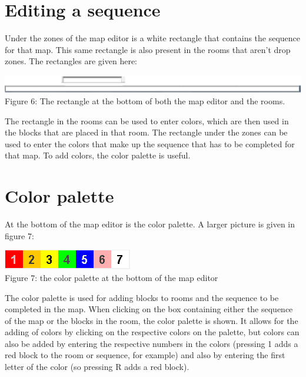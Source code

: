 \documentclass[]{article}
\begin{document}
\section*{Editing a sequence}
Under the zones of the map editor is a white rectangle that contains the sequence for that map. This same rectangle is also present in the rooms that aren't drop zones. The rectangles are given here:
\begin{center}
	\centering
	\includegraphics[scale=0.5]{SequenceEditor.png}\\
	Figure 6: The rectangle at the bottom of both the map editor and the rooms.
\end{center}
The rectangle in the rooms can be used to enter colors, which are then used in the blocks that are placed in that room. The rectangle under the zones can be used to enter the colors that make up the sequence that has to be completed for that map. To add colors, the color palette is useful.
\section*{Color palette}
At the bottom of the map editor is the color palette. A larger picture is given in figure 7:
\begin{center}
	\centering
	\includegraphics{ColorPalette.png}\\
	Figure 7: the color palette at the bottom of the map editor
\end{center}
The color palette is used for adding blocks to rooms and the sequence to be completed in the map. When clicking on the box containing either the sequence of the map or the blocks in the room, the color palette is shown. It allows for the adding of colors by clicking on the respective colors on the palette, but colors can also be added by entering the respective numbers in the colors (pressing 1 adds a red block to the room or sequence, for example) and also by entering the first letter of the color (so pressing R adds a red block).
\end{document}
